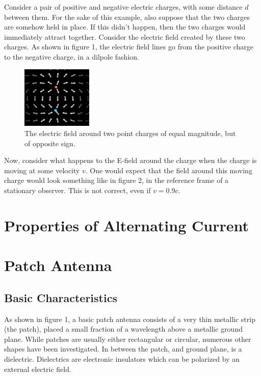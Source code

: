 \documentclass[12pt]{article}
\begin{document}
Consider a pair of positive and negative electric charges, with some distance $d$ between them. For the sake of this example, also suppose that the two charges are somehow held in place. If this didn't happen, then the two charges would immediately attract together. Consider the electric field created by these two charges. As shown in figure 1, the electric field lines go from the positive charge to the negative charge, in a dilpole fashion.

\begin{figure}[h]
    \centering
    \includegraphics[width=0.3\textwidth]{positive-negative-EField.png}
    \caption{The electric field around two point charges of equal magnitude, but of opposite sign.}
\end{figure} 

Now, consider what happens to the E-field around the charge when the charge is moving at some velocity $v$. One would expect that the field around this moving charge would look something like in figure 2, in the reference frame of a stationary observer. This is not correct, even if $v = 0.9c$.

\section{Properties of Alternating Current}

\section{Patch Antenna}

\subsection{Basic Characteristics}
As shown in figure 1, a basic patch antenna consists of a very thin metallic strip (the patch), placed a small fraction of a wavelength above a metallic ground plane. While patches are usually either rectangular or circular\cite{khan2015microstrip}, numerous other shapes have been investigated\cite{balanis2016antenna}. In between the patch, and ground plane, is a dielectric. Dielectrics are electronic insulators which can be polarized by an external electric field. 
\end{document}
